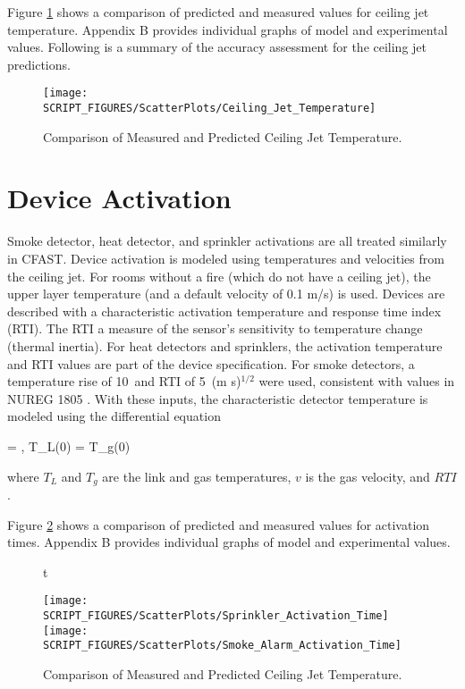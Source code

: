 Figure \ref{fig:Ceiling_Jet_Scatter} shows a comparison of predicted and measured values for ceiling jet temperature. Appendix B provides individual graphs of model and experimental values. Following is a summary of the accuracy assessment for the ceiling jet predictions.
\label{Ceiling Jet Temperature}

\begin{figure}
\begin{center}
\texttt{[image: SCRIPT\_FIGURES/ScatterPlots/Ceiling\_Jet\_Temperature]}
\end{center}
\caption{Comparison of Measured and Predicted Ceiling Jet Temperature.} \label{fig:Ceiling_Jet_Scatter}
\end{figure}

\section{Device Activation}

Smoke detector, heat detector, and sprinkler activations are all treated similarly in CFAST.  Device activation is modeled using temperatures and velocities from the ceiling jet.  For rooms without a fire (which do not have a ceiling jet), the upper layer temperature (and a default velocity of 0.1 m/s) is used.  Devices are described with a characteristic activation temperature and response time index (RTI). The RTI a measure of the sensor's sensitivity to temperature change (thermal inertia). For heat detectors and sprinklers, the activation temperature and RTI values are part of the device specification. For smoke detectors, a temperature rise of 10~\degc and RTI of 5~(m s)$^{1/2}$ were used, consistent with values in NUREG 1805 \cite{NRCNUREG1805}. With these inputs, the characteristic detector temperature is modeled using the differential equation \cite{Heskestad:1976}

\be {} =   \; , \; T_L(0) = T_g(0)  \ee

where $T_L$ and $T_g$ are the link and gas temperatures, $v$ is the gas velocity, and $RTI$.

Figure \ref{fig:Activation_Scatter} shows a comparison of predicted and measured values for activation times. Appendix B provides individual graphs of model and experimental values.
\label{Smoke Detector Activation Time}
\label{Sprinkler Activation Time}

\begin{figure}{t}
\begin{center}
\texttt{[image: SCRIPT\_FIGURES/ScatterPlots/Sprinkler\_Activation\_Time]}  \\
\texttt{[image: SCRIPT\_FIGURES/ScatterPlots/Smoke\_Alarm\_Activation\_Time]}
\end{center}
\caption{Comparison of Measured and Predicted Ceiling Jet Temperature.} \label{fig:Activation_Scatter}
\end{figure}





